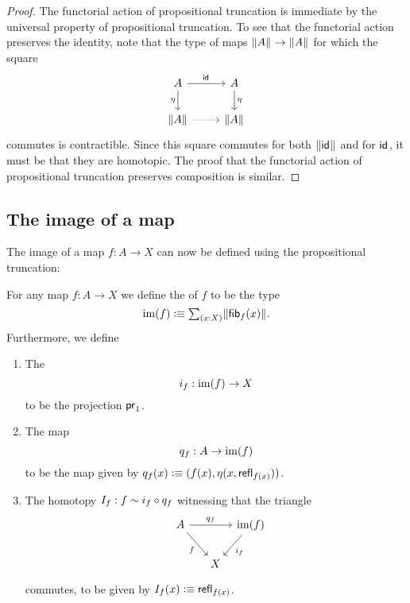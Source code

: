 \begin{proof}
  The functorial action of propositional truncation is immediate by the universal property of propositional truncation. To see that the functorial action preserves the identity, note that the type of maps $\Vert A\Vert_{}\to\Vert A\Vert_{}$ for which the square
  \begin{equation*}
    \begin{tikzcd}
      A \arrow[r,"\idfunc"] \arrow[d,swap,"\eta"] & A \arrow[d,"\eta"] \\
      \brck{A} \arrow[r,densely dotted] & \brck{A}
    \end{tikzcd}
  \end{equation*}
  commutes is contractible. Since this square commutes for both $\Vert \mathsf{id}_{}\Vert_{}$ and for $\mathsf{id}_{}$, it must be that they are homotopic. The proof that the functorial action of propositional truncation preserves composition is similar.
\end{proof}

\subsection{The image of a map}\label{sec:image-construction}
The image of a map $f:A\to X$ can now be defined using the propositional truncation:

\begin{defn}
For any map $f:A\to X$ we define the  of $f$ to be the type
\begin{equation*}
\im(f) \defeq \sm{x:X}\brck{\fib{f}{x}}.
\end{equation*}
Furthermore, we define
\begin{enumerate}
\item The 
  \begin{equation*}
    i_f:\operatorname{im}(f)\to X
  \end{equation*}
  to be the projection $\mathsf{pr}_{1}$.
\item The map
  \begin{equation*}
    q_f:A\to\operatorname{im}(f)
  \end{equation*}
  to be the map given by $q_f(x)\vcentcolon\equiv(f(x),\eta(x,\mathsf{refl}_{f(x)}))$.
\item The homotopy $I_f:f\sim i_f\circ q_f$ witnessing that the triangle
  \begin{equation*}
    \begin{tikzcd}[column sep=tiny]
      A \arrow[rr,"q_f"] \arrow[dr,swap,"f"] & & \im(f) \arrow[dl,"i_f"] \\
      \phantom{\im(f)} & X
    \end{tikzcd}
  \end{equation*}
  commutes, to be given by $I_f(x)\vcentcolon\equiv\mathsf{refl}_{f(x)}$.
\end{enumerate}
\end{defn}

